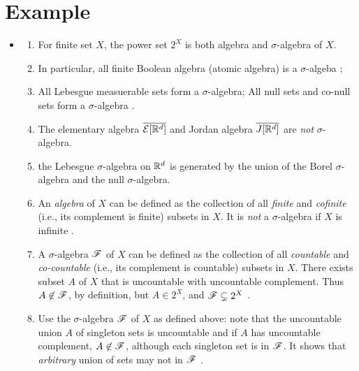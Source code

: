 \documentclass[11pt]{article}
\begin{document}
\newpage
\section{Example}
\begin{itemize}
\item \begin{example}
\begin{enumerate}
\item For finite set $X$, the power set $2^{X}$ is both algebra and $\sigma$-algebra of $X$.

\item In particular, all finite Boolean algebra (atomic algebra) is a $\sigma$-algeba \citep{tao2011introduction}; 

\item All Lebesgue measuerable sets form a $\sigma$-algebra; All null sets and co-null sets form a $\sigma$-algebra \citep{tao2011introduction}.

\item The elementary algebra $\overline{{\mathcal E}[{\mathbb R}^{d}]} $ and Jordan algebra $\overline{J[{\mathbb R}^{d}]}$ are \emph{not} $\sigma$-algebra.

\item the Lebesgue $\sigma$-algebra on ${\mathbb R}^d$ is generated by the union of the Borel $\sigma$-algebra and the null $\sigma$-algebra.

\item An \emph{algebra} of $X$ can be defined as the collection of all \emph{finite} and \emph{cofinite} (i.e., its complement is finite) subsets in $X$.  It is \emph{not} a $\sigma$-algebra if $X$ is infinite \citep{billingsley2008probability}. 

\item A $\sigma$-algebra ${\mathscr F}$ of $X$ can be defined as the collection of all \emph{countable} and \emph{co-countable} (i.e., its complement is countable) subsets in $X$. There exists subset $A$ of $X$ that is uncountable with uncountable complement.  Thus $A\not\in {\mathscr F}$, by definition, but $A\in 2^{X}$, and ${\mathscr F} \subsetneq 2^{X}$ \citep{billingsley2008probability}.

\item Use the $\sigma$-algebra ${\mathscr F}$ of $X$ as defined above: note that the uncountable union $A$ of singleton sets is uncountable and if $A$ has uncountable complement, $A\not\in {\mathscr F}$, although each singleton set is in ${\mathscr F}$. It shows that \emph{arbitrary} union of sets may not in ${\mathscr F}$ \citep{billingsley2008probability}.


\end{enumerate}
\end{example}
\end{itemize}
\end{document}
